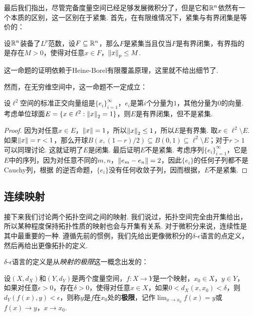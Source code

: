 最后我们指出，尽管完备度量空间已经足够发展微积分了，但是它和$\mathbb{R}^n$依然有一个本质的区别，这一区别在于紧集. 首先，在有限维情况下，紧集与有界闭集是等价的：

\begin{theorem}\label{theorem:compact-bounded}
设$\mathbb{R}^n$装备了$L^p$范数，设$F\subseteq\mathbb{R}^n$，那么$F$是紧集当且仅当$F$是有界闭集，有界指的是存在$M>0$，使得对任意$x\in F$，$\left\|x\right\|_p\leq M$.
\end{theorem}

这一命题的证明依赖于Heine-Borel有限覆盖原理，这里就不给出细节了. 

然而，在无穷维空间中，这一命题不一定成立：

\begin{proposition}\label{proposition:compact-not-bounded}
设$\ell^2$空间的标准正交向量组是$\{e_i\}_{i=1}^\infty$，$e_i$是第$i$个分量为$1$，其他分量为$0$的向量. 考虑单位球面$E=\{x\in\ell^2:\left\|x\right\|_2=1\}$，则$E$是有界闭集，但不是紧集. 
\end{proposition}
\begin{proof}
    因为对任意$x\in E$，$\left\|x\right\|=1$，所以$\left\|x\right\|_2\leq 1$，所以$E$是有界集. 取$x\in\ell^2\setminus E$. 如果$\left\|x\right\|=r<1$，那么开球$B(x,(1-r)/2)\subseteq B(0,1)\subseteq \ell^2\setminus E$；对于$r>1$可以同理讨论. 这就证明了$E$是闭集. 最后证明$E$不是紧集. 考虑序列$\{e_i\}_{i=1}^\infty$，它是$E$中的序列，因为对任意不同的$m,n$，$\left\|e_m-e_n\right\|=2$，因此$\{e_i\}$的任何子列都不是Cauchy列，根据 的逆否命题，$\{e_i\}$没有任何收敛子列，因而根据，$E$不是紧集. 
\end{proof}

\subsection{连续映射}
接下来我们讨论两个拓扑空间之间的映射. 我们说过，拓扑空间完全由开集给出，所以某种程度保持拓扑性质的映射也会与开集有关系. 对于微积分来说，连续性是其中最重要的一种. 遵循先前的惯例，我们先给出更像微积分的$\delta$-$\epsilon$语言的点定义，然后再给出更像拓扑的定义. 

$\delta$-$\epsilon$语言的定义是从\textit{映射的极限}这一概念出发的：

\begin{definition}[映射的极限]
    设$(X,d_X)$和$(Y,d_Y)$是两个度量空间，$f:X\to Y$是一个映射，$x_0\in X$，$y\in Y$，如果对任意$\epsilon>0$，存在$\delta>0$，使得对任意$x\in X$，如果$0<d_X(x,x_0)<\delta$，则$d_Y(f(x),y)<\epsilon$，则称$y$是$f$在$x_0$处的\textbf{极限}，记作$\lim_{x\to x_0}f(x)=y$或$f(x)\to y$，$x\to x_0$.
\end{definition}

